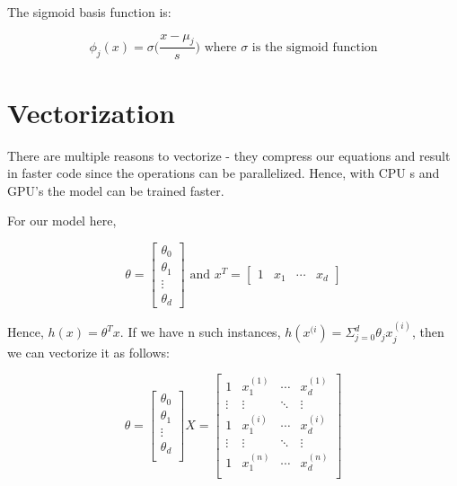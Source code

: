 The sigmoid basis function is:

\begin{equation}
    \phi_j (x) = \sigma\Big(\frac{x - \mu_j}{s}\Big) \text{ where $\sigma$ is the sigmoid function}
\end{equation}

\section{Vectorization}

There are multiple reasons to vectorize - they compress our equations and result in faster code since the operations can be parallelized. Hence, with CPU
s and GPU's the model can be trained faster.

For our model here,

\begin{equation}
    \theta = \begin{bmatrix}
    \theta_0 \\
    \theta_1 \\
    \vdots \\
    \theta_d
    \end{bmatrix} \text{ and } x^T = \begin{bmatrix}
    1 & x_1 & \cdots & x_d
    \end{bmatrix}
\end{equation}

Hence, $h(x) = \theta^Tx$. If we have n such instances, $h(x^{(i}) = \Sigma_{j=0}^{d} \theta_j x_j^{(i)}$, then we can vectorize it as follows:

\begin{equation}
    \theta = \begin{bmatrix}
    \theta_0 \\
    \theta_1 \\
    \vdots \\
    \theta_d \\
    \end{bmatrix} X = \begin{bmatrix}
    1 & x_1^{(1)} & \cdots & x_d^{(1)} \\
    \vdots & \vdots & \ddots & \vdots \\
    1 & x_1^{(i)} & \cdots & x_d^{(i)} \\
    \vdots & \vdots & \ddots & \vdots \\
    1 & x_1^{(n)} & \cdots & x_d^{(n)} \\
    \end{bmatrix}
\end{equation}

